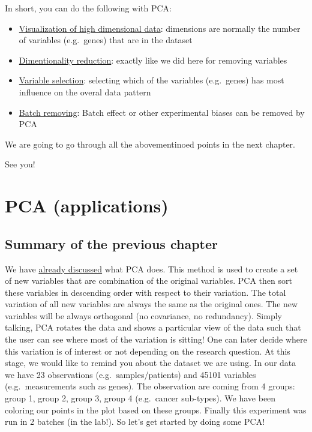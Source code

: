 \documentclass[
]{book}
\providecommand{\tightlist}{%
  \setlength{\itemsep}{0pt}\setlength{\parskip}{0pt}}
\theoremstyle{definition}
\theoremstyle{definition}
\theoremstyle{definition}
\theoremstyle{remark}
\begin{document}
In short, you can do the following with PCA:

\begin{itemize}
\tightlist
\item
  \protect\hyperlink{pcavisdimreduct}{Visualization of high dimensional data}: dimensions are normally the number of variables (e.g.~genes) that are in the dataset
\item
  \protect\hyperlink{pcavisdimreduct}{Dimentionality reduction}: exactly like we did here for removing variables
\item
  \protect\hyperlink{pcavarselect}{Variable selection}: selecting which of the variables (e.g.~genes) has most influence on the overal data pattern
\item
  \protect\hyperlink{pcabtrm}{Batch removing}: Batch effect or other experimental biases can be removed by PCA
\end{itemize}

We are going to go through all the abovementinoed points in the next chapter.

See you!

\hypertarget{pcaapplications}{%
\chapter{PCA (applications)}\label{pcaapplications}}

\hypertarget{summary-of-the-previous-chapter-1}{%
\section{Summary of the previous chapter}\label{summary-of-the-previous-chapter-1}}

We have \protect\hyperlink{pcafri}{already discussed} what PCA does. This method is used to create a set of new variables that are combination of the original variables. PCA then sort these variables in descending order with respect to their variation. The total variation of all new variables are always the same as the original ones. The new variables will be always orthogonal (no covariance, no redundancy). Simply talking, PCA rotates the data and shows a particular view of the data such that the user can see where most of the variation is sitting! One can later decide where this variation is of interest or not depending on the research question. At this stage, we would like to remind you about the dataset we are using. In our data we have 23 observations (e.g.~samples/patients) and 45101 variables (e.g.~measurements such as genes). The observation are coming from 4 groups: group 1, group 2, group 3, group 4 (e.g.~cancer sub-types). We have been coloring our points in the plot based on these groups. Finally this experiment was run in 2 batches (in the lab!). So let's get started by doing some PCA!
\end{document}
